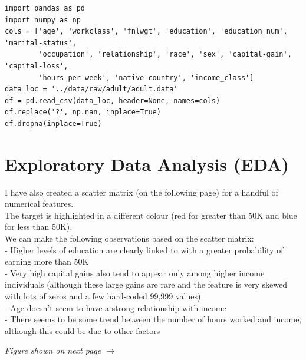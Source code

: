\documentclass[11pt]{article}
\begin{document}
\begin{lstlisting}[caption={Cleaning Adult Income dataset}, label={lst:cleaning}]
import pandas as pd
import numpy as np
cols = ['age', 'workclass', 'fnlwgt', 'education', 'education_num', 'marital-status', 
        'occupation', 'relationship', 'race', 'sex', 'capital-gain', 'capital-loss', 
        'hours-per-week', 'native-country', 'income_class']
data_loc = '../data/raw/adult/adult.data'
df = pd.read_csv(data_loc, header=None, names=cols)
df.replace('?', np.nan, inplace=True)
df.dropna(inplace=True)
\end{lstlisting}

\section{Exploratory Data Analysis (EDA)}
I have also created a scatter matrix (on the following page) for a handful of numerical features. \\
The target is highlighted in a different colour (red for greater than 50K and blue for less than 50K). \\
We can make the following observations based on the scatter matrix: \\
- Higher levels of education are clearly linked to with a greater probability of earning more than 50K \\
- Very high capital gains also tend to appear only among higher income individuals (although these large gains are rare and the feature is very skewed with lots of zeros and a few hard-coded 99,999 values) \\
- Age doesn't seem to have a strong relationship with income \\
- There seems to be some trend between the number of hours worked and income, although this could be due to other factors \\

\vfill
\begin{center}
    \textit{Figure shown on next page $\rightarrow$}
\end{center}
\newpage
\end{document}
